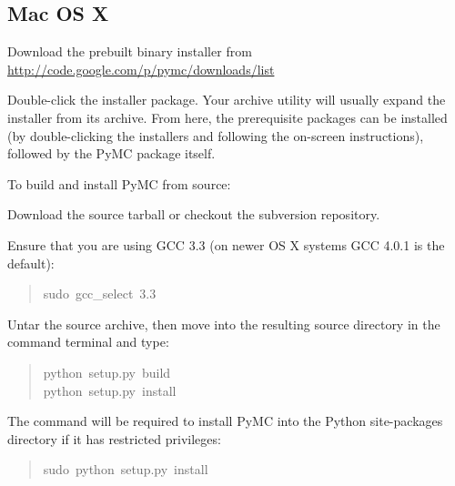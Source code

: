 \subsection*{Mac OS X}
\label{mac-os-x}
\setcounter{listcnt0}{0}
\begin{list}{.}
{
\setlength{\rightmargin}{\leftmargin}
}
\item {} 
Download the prebuilt binary installer from \href{http://code.google.com/p/pymc/downloads/list}{http://code.google.com/p/pymc/downloads/list}

\item {} 
Double-click the installer package. Your archive utility will usually expand
the installer from its archive. From here, the prerequisite packages can be
installed (by double-clicking the installers and following the on-screen
instructions), followed by the PyMC package itself.

\end{list}

To build and install PyMC from source:
\setcounter{listcnt0}{0}
\begin{list}{.}
{
\setlength{\rightmargin}{\leftmargin}
}
\item {} 
Download the source tarball or checkout the subversion repository.

\item {} 
Ensure that you are using GCC 3.3 (on newer OS X systems GCC 4.0.1 is the default):
\begin{quote}{\ttfamily \raggedright \noindent
sudo~gcc{\_}select~3.3
}\end{quote}

\item {} 
Untar the source archive, then move into the resulting source directory in
the command terminal and type:
\begin{quote}{\ttfamily \raggedright \noindent
python~setup.py~build~\\
python~setup.py~install
}\end{quote}

\end{list}

The  command will be required to install PyMC into the Python site-packages
directory if it has restricted privileges:
\begin{quote}{\ttfamily \raggedright \noindent
sudo~python~setup.py~install
}\end{quote}

